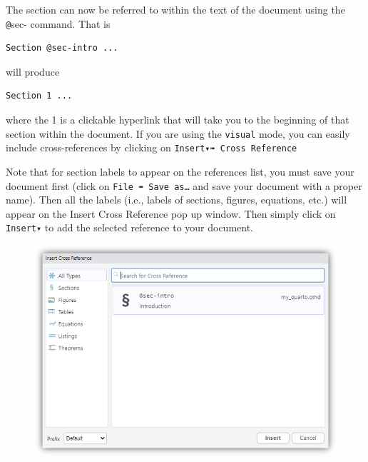 \documentclass[
  letterpaper,
  DIV=11,
  numbers=noendperiod]{scrartcl}
\begin{document}
The section can now be referred to within the text of the document using
the \texttt{@}sec- command. That is

\begin{verbatim}
Section @sec-intro ...
\end{verbatim}

will produce

\begin{verbatim}
Section 1 ...
\end{verbatim}

where the 1 is a clickable hyperlink that will take you to the beginning
of that section within the document. If you are using the
\texttt{visual} mode, you can easily include cross-references by
clicking on \texttt{Insert▾➠\ Cross\ Reference}

Note that for section labels to appear on the references list, you must
save your document first (click on \texttt{File\ ➠\ Save\ as…} and save
your document with a proper name). Then all the labels (i.e., labels of
sections, figures, equations, etc.) will appear on the Insert Cross
Reference pop up window. Then simply click on \texttt{Insert▾} to add
the selected reference to your document.

\begin{figure}

{\centering \includegraphics[width=5.5in,height=\textheight]{images/quarto5.png}

}

\end{figure}
\end{document}
